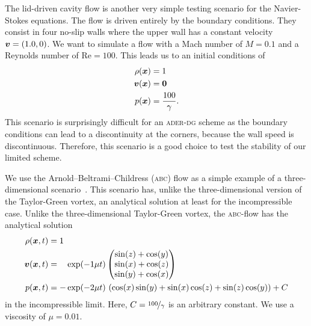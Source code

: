 The lid-driven cavity flow is another very simple testing scenario for the Navier-Stokes equations.
The flow is driven entirely by the boundary conditions.
They consist in four no-slip walls where the upper wall has a constant velocity $\bm{v} = (1.0, 0)$.
We want to simulate a flow with a Mach number of $M = 0.1$ and a Reynolds number of $\text{Re} = 100$.
This leads us to an initial conditions of
\begin{align}
  \label{eq:taylor-green}
  \begin{split}
  \rho(\bm{x}) &= 1\\
  \bm{v}(\bm{x}) &=  \bm{0}\\
  p(\bm{x}) &= \frac{100}{\gamma}.
  \end{split}
\end{align}
This scenario is surprisingly difficult for an \textsc{ader-dg} scheme as the boundary conditions can lead to a discontinuity at the corners, because the wall speed is discontinuous.
Therefore, this scenario is a good choice to test the stability of our limited scheme.

We use the Arnold–Beltrami–Childress (\textsc{abc}) flow as a simple example of a three-dimensional scenario~\cite{tavelli2016staggered}.
This scenario has, unlike the three-dimensional version of the Taylor-Green vortex, an analytical solution at least for the incompressible case.
Unlike the three-dimensional Taylor-Green vortex, the \textsc{abc}-flow has the analytical solution
\begin{align}
  \label{eq:abc-flow}
  \begin{split}
  \rho(\bm{x}, t) &= 1\\
  \bm{v}(\bm{x}, t) &= \phantom{-} \exp(-1\mu t)
  \begin{pmatrix}
    \sin(z) + \cos(y)\\
    \sin(x) + \cos(z)\\
    \sin(y) + \cos(x)
  \end{pmatrix} \\
  p(\bm{x}, t) &= -\exp(-2 \mu t) \, \left(\cos(x)\sin(y) + \sin(x)\cos(z) + \sin(z)\cos(y)\right)
  + C
  \end{split}
\end{align}
in the incompressible limit.
Here, $C = \nicefrac{100}{\gamma}$ is an arbitrary constant.
We use a viscosity of $\mu = 0.01$.

